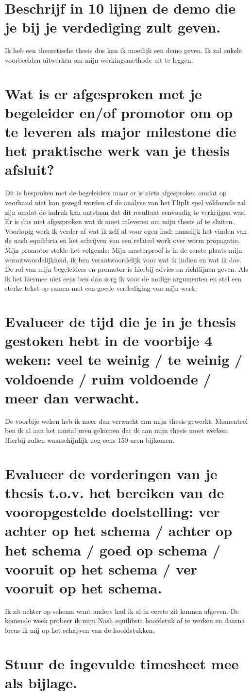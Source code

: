 \documentclass[a4paper, 11pt]{article}
\begin{document}
\section{Beschrijf in 10 lijnen de demo die je bij je verdediging zult geven.}
Ik heb een theoretische thesis dus kan ik moeilijk een demo geven. Ik zal enkele voorbeelden uitwerken om mijn werkingsmethode uit te leggen.
\section{Wat is er afgesproken met je begeleider en/of promotor om op te leveren als major milestone die het praktische werk van je thesis afsluit?}
Dit is besproken met de begeleiders maar er is niets afgesproken omdat op voorhand niet kan gezegd worden of de analyse van het FlipIt spel voldoende zal zijn omdat de indruk kan ontstaan dat dit resultaat eenvoudig te verkrijgen was. Er is dus niet afgesproken wat ik moet inleveren om mijn thesis af te sluiten.
Voorlopig werk ik verder af wat ik zelf al voor ogen had; namelijk het vinden van de nash equilibria en het schrijven van een related work over worm propagatie. \\
Mijn promotor stelde het volgende: Mijn masterproef is in de eerste plaats mijn verantwoordelijkheid, ik ben verantwoordelijk voor wat ik indien en wat ik doe. De rol van mijn begeleiders en promotor is hierbij advies en richtlijnen geven.
Als ik het hiermee niet eens ben dan zorg ik voor de nodige argumenten en stel een sterke tekst op samen met een goede verdediging van mijn werk. 
\section{Evalueer de tijd die je in je thesis gestoken hebt in de voorbije 4 weken: veel te weinig / te weinig / voldoende / ruim voldoende / meer dan verwacht.}
De voorbije weken heb ik meer dan verwacht aan mijn thesis gewerkt. Momenteel ben ik al aan het aantal uren gekomen dat ik aan mijn thesis moet werken. Hierbij zullen waarschijnlijk nog eens 150 uren bijkomen. 
\section{Evalueer de vorderingen van je thesis t.o.v. het bereiken van de vooropgestelde doelstelling: ver achter op het schema / achter op het schema / goed op schema / vooruit op het schema / ver vooruit op het schema.}
Ik zit achter op schema want anders had ik al in eerste zit kunnen afgeven. De komende week probeer ik mijn Nash equilibria hoofdstuk af te werken en daarna focus ik mij op het schrijven van de hoofdstukken.
\section{Stuur de ingevulde timesheet mee als bijlage.}
\end{document}
